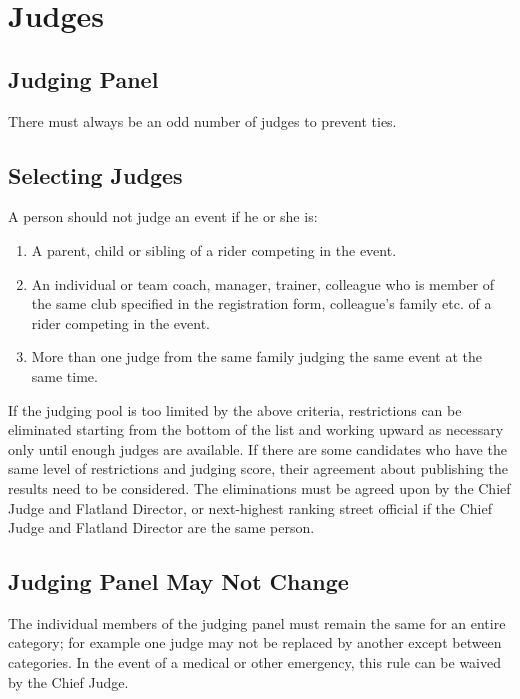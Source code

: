 \section{Judges}

\subsection{Judging Panel}

There must always be an odd number of judges to prevent ties. 

\subsection{Selecting Judges}
A person should not judge an event if he or she is:
\begin{enumerate}
\item A parent, child or sibling of a rider competing in the event.
\item An individual or team coach, manager, trainer, colleague who is member of the same club specified in the registration form, colleague's family etc. of a rider competing in the event.
\item More than one judge from the same family judging the same event at the same time.
\end{enumerate}

If the judging pool is too limited by the above criteria, restrictions can be eliminated starting from the bottom of the list and working upward as necessary only until enough judges are available.
If there are some candidates who have the same level of restrictions and judging score, their agreement about publishing the results need to be considered.
The eliminations must be agreed upon by the Chief Judge and Flatland Director, or next-highest ranking street official if the Chief Judge and Flatland Director are the same person.

\subsection{Judging Panel May Not Change}

The individual members of the judging panel must remain the same for an entire category; for example one judge may not be replaced by another except between categories.
In the event of a medical or other emergency, this rule can be waived by the Chief Judge.

